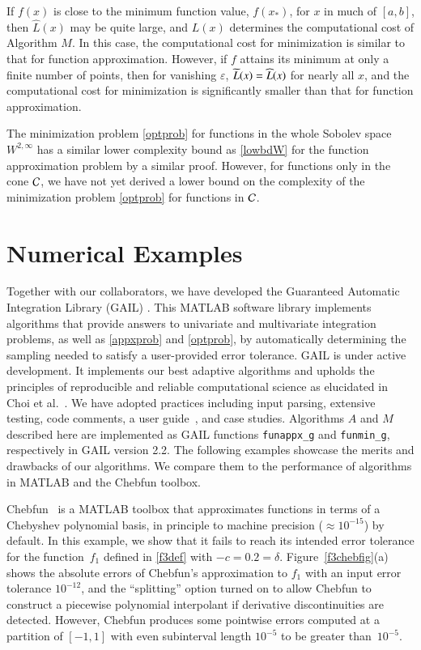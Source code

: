 \documentclass[review]{elsarticle}
\theoremstyle{definition}
\renewcommand{\cw}{W}
\newcommand{\chL}{\widehat{L}}
\newtheorem{exmp}{Example}
\newcommand{\funappxg}{\texttt{funappx\_g}\xspace}
\newcommand{\funming}{\texttt{funmin\_g}\xspace}
\begin{document}
If $f(x)$ is close to the minimum function value, $f(x_*)$, for $x$ in much of
$[a,b]$, then $\chL(x)$ may be quite large, and $L(x)$  determines the
computational cost of Algorithm $M$. In this case, the computational cost for
minimization is similar to that for function approximation. However, if $f$ attains its
minimum at only a finite number of points, then for vanishing $\varepsilon$,
$\widetilde{L}(x) = \widehat{L}(x)$ for nearly all $x$, and the computational cost for minimization
is significantly smaller than that for function approximation.


The minimization problem \eqref{optprob} for functions in the whole Sobolev
space $\cw^{2,\infty}$ has a similar lower complexity bound as \eqref{lowbdW}
for the function approximation problem by a similar proof. However, for
functions only in the cone $\mathcal{C}$, we have not yet derived a lower bound on the
complexity of the minimization problem \eqref{optprob} for functions in $\mathcal{C}$.

\section{Numerical Examples} \label{sec:examples}

Together with our collaborators, we have developed the Guaranteed Automatic
Integration Library (GAIL) \cite{ChoEtal15a}. This MATLAB software library
implements algorithms that provide answers to univariate and multivariate
integration problems, as well as \eqref{appxprob} and \eqref{optprob}, by
automatically determining the sampling needed to satisfy a user-provided error
tolerance. GAIL is under active development. It implements our best adaptive
algorithms and upholds the principles of reproducible and reliable computational
science as elucidated in Choi et al.~\cite{Cho13,Cho14a}. We have adopted practices including input parsing, extensive testing, code comments, a user
guide~\cite{Gail_ug}, and case studies. Algorithms $A$ and $M$ described here are implemented
as GAIL functions \funappxg{} and \funming, respectively in GAIL version 2.2. The following examples
showcase the merits and drawbacks of our algorithms. We compare them to the
performance of algorithms in MATLAB and the Chebfun toolbox.

Chebfun~\cite{TrefEtal16a} is a MATLAB toolbox that approximates functions in
terms of a Chebyshev polynomial basis, in principle to machine precision
($\approx 10^{-15}$) by default. In this example, we show that it fails to reach
its intended error tolerance for the function~$f_1$ defined in \eqref{f3def}
with $-c = 0.2 = \delta$.
Figure~\ref{f3chebfig}(a) shows the absolute errors of Chebfun's approximation to
$f_1$  with an input error tolerance $10^{-12}$, and the ``splitting'' option  turned on to allow
Chebfun to construct a piecewise polynomial interpolant if derivative
discontinuities are detected.  However, Chebfun produces some pointwise errors computed at a partition of $[-1,1]$ with even subinterval length $10^{-5}$ to be greater
than~$10^{-5}$.
\end{document}
